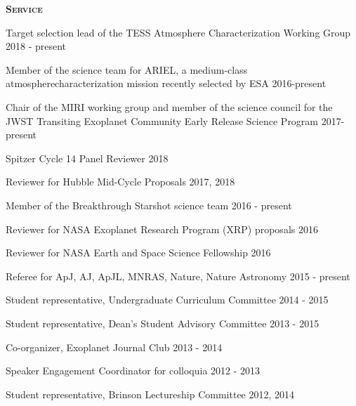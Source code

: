 \documentclass[12pt,letterpaper]{article}
\begin{document}
\vspace{3mm}
\textbf{\textsc{Service}} 
\begin{compactitem}[]
\item {Target selection lead of the TESS Atmosphere Characterization Working Group \hfill 2018 - present}	
\item {Member of the science team for ARIEL, a medium-class atmosphere\newline characterization mission recently selected by ESA \hfill 2016-present}
\item {Chair of the MIRI working group and member of the science council for the \newline JWST Transiting Exoplanet Community Early Release Science Program \hfill 2017- present}
\item {Spitzer Cycle 14 Panel Reviewer \hfill 2018}
\item {Reviewer for Hubble Mid-Cycle Proposals \hfill 2017, 2018}
\item {Member of the Breakthrough Starshot science team \hfill 2016 - present}
\item Reviewer for NASA Exoplanet Research Program (XRP) proposals \hfill	2016
\item Reviewer for NASA Earth and Space Science Fellowship \hfill 2016
\item Referee for ApJ, AJ, ApJL, MNRAS, Nature, Nature Astronomy \hfill 2015 - present
\item Student representative, Undergraduate Curriculum Committee \hfill 2014 - 2015
\item Student representative, Dean's Student Advisory Committee \hfill 2013 - 2015
\item Co-organizer, Exoplanet Journal Club \hfill 2013 - 2014
\item Speaker Engagement Coordinator for colloquia \hfill 2012 - 2013
\item Student representative, Brinson Lectureship Committee \hfill 2012, 2014
\end{compactitem}
\end{document}
